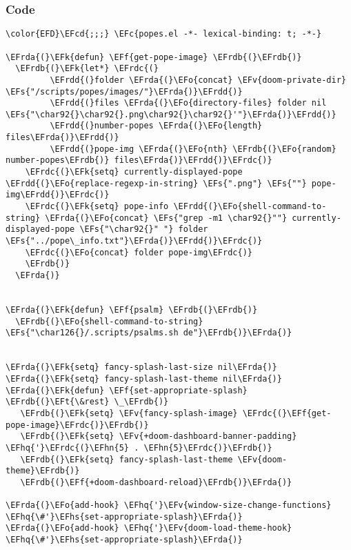 \documentclass[a4wide,10pt]{article}
\newcommand{\EFc}[1]{\textcolor{EFc}{#1}} %
\newcommand{\EFcd}[1]{\textcolor{EFcd}{#1}} %
\newcommand{\EFs}[1]{\textcolor{EFs}{#1}} %
\newcommand{\EFk}[1]{\textcolor{EFk}{#1}} %
\newcommand{\EFf}[1]{\textcolor{EFf}{#1}} %
\newcommand{\EFv}[1]{\textcolor{EFv}{#1}} %
\newcommand{\EFt}[1]{\textcolor{EFt}{#1}} %
\newcommand{\EFo}[1]{\textcolor{EFo}{#1}} %
\newcommand{\EFhn}[1]{\textcolor{EFhn}{\textbf{#1}}} %
\newcommand{\EFhq}[1]{\textcolor{EFhq}{#1}} %
\newcommand{\EFhs}[1]{\textcolor{EFhs}{#1}} %
\newcommand{\EFrda}[1]{\textcolor{EFrda}{#1}} %
\newcommand{\EFrdb}[1]{\textcolor{EFrdb}{#1}} %
\newcommand{\EFrdc}[1]{\textcolor{EFrdc}{#1}} %
\newcommand{\EFrdd}[1]{\textcolor{EFrdd}{#1}} %
\begin{document}
\subsubsection{Code}
\label{sec:org74ca30f}
\begin{Code}
\begin{Verbatim}
\color{EFD}\EFcd{;;;} \EFc{popes.el -*- lexical-binding: t; -*-}

\EFrda{(}\EFk{defun} \EFf{get-pope-image} \EFrdb{(}\EFrdb{)}
  \EFrdb{(}\EFk{let*} \EFrdc{(}
         \EFrdd{(}folder \EFrda{(}\EFo{concat} \EFv{doom-private-dir} \EFs{"/scripts/popes/images/"}\EFrda{)}\EFrdd{)}
         \EFrdd{(}files \EFrda{(}\EFo{directory-files} folder nil \EFs{"\char92{}\char92{}.png\char92{}\char92{}'"}\EFrda{)}\EFrdd{)}
         \EFrdd{(}number-popes \EFrda{(}\EFo{length} files\EFrda{)}\EFrdd{)}
         \EFrdd{(}pope-img \EFrda{(}\EFo{nth} \EFrdb{(}\EFo{random} number-popes\EFrdb{)} files\EFrda{)}\EFrdd{)}\EFrdc{)}
    \EFrdc{(}\EFk{setq} currently-displayed-pope \EFrdd{(}\EFo{replace-regexp-in-string} \EFs{".png"} \EFs{""} pope-img\EFrdd{)}\EFrdc{)}
    \EFrdc{(}\EFk{setq} pope-info \EFrdd{(}\EFo{shell-command-to-string} \EFrda{(}\EFo{concat} \EFs{"grep -m1 \char92{}""} currently-displayed-pope \EFs{"\char92{}" "} folder \EFs{"../pope\_info.txt"}\EFrda{)}\EFrdd{)}\EFrdc{)}
    \EFrdc{(}\EFo{concat} folder pope-img\EFrdc{)}
    \EFrdb{)}
  \EFrda{)}


\EFrda{(}\EFk{defun} \EFf{psalm} \EFrdb{(}\EFrdb{)}
  \EFrdb{(}\EFo{shell-command-to-string} \EFs{"\char126{}/.scripts/psalms.sh de"}\EFrdb{)}\EFrda{)}


\EFrda{(}\EFk{setq} fancy-splash-last-size nil\EFrda{)}
\EFrda{(}\EFk{setq} fancy-splash-last-theme nil\EFrda{)}
\EFrda{(}\EFk{defun} \EFf{set-appropriate-splash} \EFrdb{(}\EFt{\&rest} \_\EFrdb{)}
   \EFrdb{(}\EFk{setq} \EFv{fancy-splash-image} \EFrdc{(}\EFf{get-pope-image}\EFrdc{)}\EFrdb{)}
   \EFrdb{(}\EFk{setq} \EFv{+doom-dashboard-banner-padding} \EFhq{'}\EFrdc{(}\EFhn{5} . \EFhn{5}\EFrdc{)}\EFrdb{)}
   \EFrdb{(}\EFk{setq} fancy-splash-last-theme \EFv{doom-theme}\EFrdb{)}
   \EFrdb{(}\EFf{+doom-dashboard-reload}\EFrdb{)}\EFrda{)}

\EFrda{(}\EFo{add-hook} \EFhq{'}\EFv{window-size-change-functions} \EFhq{\#'}\EFhs{set-appropriate-splash}\EFrda{)}
\EFrda{(}\EFo{add-hook} \EFhq{'}\EFv{doom-load-theme-hook} \EFhq{\#'}\EFhs{set-appropriate-splash}\EFrda{)}


\end{Verbatim}
\end{Code}
\end{document}
